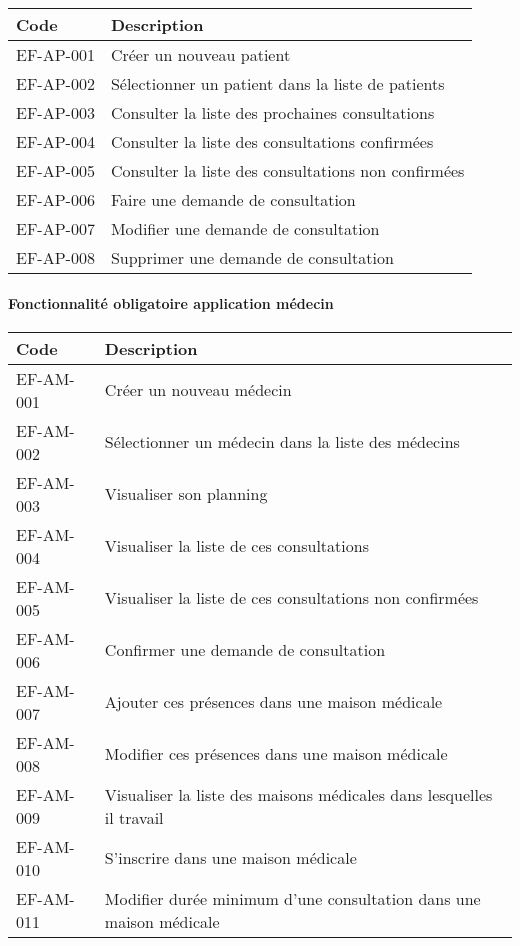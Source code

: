 \documentclass[a4paper,11pt]{article}
\begin{document}
	\begin{table}[ht]
		\begin{tabular}{|m{2.5cm}|m{12.5cm}|}
			\hline
			\textbf{Code} & \textbf{Description} \\ \hline
			EF-AP-001 & Créer un nouveau patient \\ \hline
			EF-AP-002 & Sélectionner un patient dans la liste de patients \\ \hline
			EF-AP-003 & Consulter la liste des prochaines consultations \\ \hline
			EF-AP-004 & Consulter la liste des consultations confirmées \\ \hline
			EF-AP-005 & Consulter la liste des consultations non confirmées \\ \hline
			EF-AP-006 & Faire une demande de consultation \\ \hline
			EF-AP-007 & Modifier une demande de consultation \\ \hline
			EF-AP-008 & Supprimer une demande de consultation \\ \hline
		\end{tabular}
	\end{table}

	\paragraph{Fonctionnalité obligatoire application médecin}
	
	\begin{table}[ht]
		\begin{tabular}{|m{2.5cm}|m{12.5cm}|}
			\hline
			\textbf{Code} & \textbf{Description} \\ \hline
			EF-AM-001 & Créer un nouveau médecin \\ \hline
			EF-AM-002 & Sélectionner un médecin dans la liste des médecins \\ \hline
			EF-AM-003 & Visualiser son planning \\ \hline
			EF-AM-004 & Visualiser la liste de ces consultations \\ \hline
			EF-AM-005 & Visualiser la liste de ces consultations non confirmées \\ \hline
			EF-AM-006 & Confirmer une demande de consultation \\ \hline
			EF-AM-007 & Ajouter ces présences dans une maison médicale \\ \hline
			EF-AM-008 & Modifier ces présences dans une maison médicale \\ \hline
			EF-AM-009 & Visualiser la liste des maisons médicales dans lesquelles il travail \\ \hline
			EF-AM-010 & S'inscrire dans une maison médicale \\ \hline
			EF-AM-011 & Modifier durée minimum d'une consultation dans une maison médicale \\ \hline
		\end{tabular}
	\end{table}
	
\end{document}
